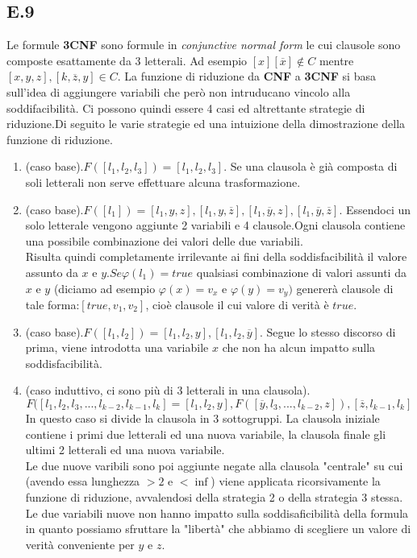 \documentclass[a4paper]{article}
\begin{document}
\subsection{E.9}
Le formule \textbf{3CNF} sono formule in \textit{conjunctive normal form} le cui clausole sono composte esattamente da 3 letterali.
Ad esempio $[x][\overline x] \notin C$ mentre $[x,y,z],[k,\overline z, y] \in C$.
La funzione di riduzione da \textbf{CNF} a \textbf{3CNF} si basa sull'idea di aggiungere variabili che però non intruducano vincolo alla soddifacibilità.
Ci possono quindi essere 4 casi ed altrettante strategie di riduzione.Di seguito le varie strategie ed una intuizione della dimostrazione della funzione di riduzione.
\begin{enumerate}
	\item (caso base).$F([l_1,l_2,l_3]) = [l_1, l_2, l_3]$.
		Se una clausola è già composta di soli letterali non serve effettuare alcuna trasformazione.
	\item (caso base).$F([l_1])=[l_1,y,z],[l_1,y,\overline z],[l_1,\overline y,z],[l_1,\overline y,\overline z]$.
		Essendoci un solo letterale vengono aggiunte 2 variabili e 4 clausole.Ogni clausola contiene una possibile combinazione dei valori delle due variabili.\\
		Risulta quindi completamente irrilevante ai fini della soddisfacibilità il valore assunto da $x$ e $y$.$Se \varphi(l_1)=true$ qualsiasi combinazione di valori assunti da $x$ e $y$ (diciamo ad esempio $\varphi(x)=v_x$ e $\varphi(y)=v_y)$ genererà clausole di tale forma:$[true,v_1,v_2]$, cioè clausole il cui valore di verità è $true$.
	\item (caso base).$F([l_1,l_2])=[l_1,l_2,y],[l_1,l_2,\overline y]$. Segue lo stesso discorso di prima, viene introdotta una variabile $x$ che non ha alcun impatto sulla soddisfacibilità.
	\item (caso induttivo, ci sono più di 3 letterali in una clausola).
		$$F([l_1,l_2, l_3, ... ,l_{k-2}, l_{k-1}, l_k]=[l_1,l_2,y], F([\overline y, l_3, ... ,l_{k-2},z]) , [\overline z,l_{k-1},l_k]$$
		In questo caso si divide la clausola in 3 sottogruppi. La clausola iniziale contiene i primi due letterali ed una nuova variabile, la clausola finale gli ultimi 2 letterali ed una nuova variabile.\\
		Le due nuove varibili sono poi aggiunte negate alla clausola "centrale" su cui (avendo essa lunghezza $>2$ e $< \inf$) viene applicata ricorsivamente la funzione di riduzione, avvalendosi della strategia 2 o della strategia 3 stessa.
		Le due variabili nuove non hanno impatto sulla soddisaficibilità della formula in quanto possiamo sfruttare la "libertà" che abbiamo di scegliere un valore di verità conveniente per $y$ e $z$.\\

\end{enumerate}
\end{document}
